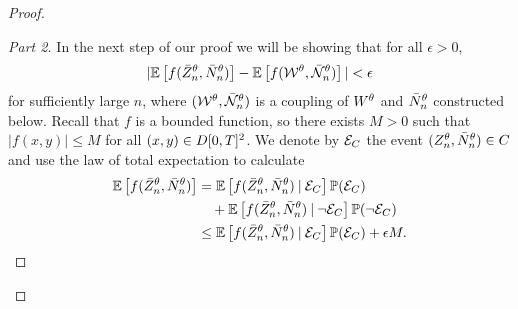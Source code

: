 \begin{proof}
\begin{proof}[Part 2]\renewcommand{\qedsymbol}{}
In the next step of our proof we will be showing that for all $\epsilon > 0$,
\begin{equation}
|\mathbb{E} \left[  f(\bar{Z}^{\theta}_n, \bar{N}_n^{\theta}) \right] - \mathbb{E} \left[ f(\mathcal{W}^{\theta}, \bar{\mathcal{N}}_n^{\theta}) \right]| < \epsilon
\end{equation}
for sufficiently large $n$,
where $(\mathcal{W}^{\theta}, \bar{\mathcal{N}}_n^{\theta})$ is a coupling of $W^{\theta}$ and $\bar{N}_n^{\theta}$ constructed below.
Recall that $f$ is a bounded function, so there exists $M>0$ such that $|f(x,y)| \leq M$ for all $(x,y) \in D[0, T]^2$.
We denote by $\mathcal{E}_{C}$ the event $(Z_n^{\theta}, \bar{N}_n^{\theta}) \in C$ and use the law of total expectation to calculate
\begin{equation} \label{E: Estimation step 1}
\begin{aligned}
\mathbb{E} \left[  f(\bar{Z}^{\theta}_n, \bar{N}_n^{\theta}) \right] 
&= \mathbb{E} \left[ f(\bar{Z}^{\theta}_n, \bar{N}_n^{\theta}) \: | \: \mathcal{E}_{C} \right] \mathbb{P}(\mathcal{E}_{C}) \\
&\quad + \mathbb{E} \left[ f(\bar{Z}^{\theta}_n, \bar{N}_n^{\theta}) \: | \: \neg\mathcal{E}_{C} \right] \mathbb{P}(\neg\mathcal{E}_{C}) \\
&\leq \mathbb{E} \left[ f(\bar{Z}^{\theta}_n, \bar{N}_n^{\theta}) \: | \: \mathcal{E}_{C} \right]\mathbb{P}(\mathcal{E}_{C}) + \epsilon M.
\end{aligned}
\end{equation}


\end{proof}
\end{proof}
